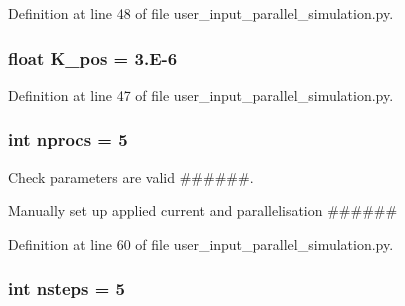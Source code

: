 Definition at line 48 of file user\-\_\-input\-\_\-parallel\-\_\-simulation.\-py.

\hypertarget{namespaceuser__input__parallel__simulation_ab1a8ebec490ba1301f818bd1c5f1f3fa}{
\subsubsection[{K\-\_\-pos}]{\setlength{\rightskip}{0pt plus 5cm}float K\-\_\-pos = 3.\-E-\/6}}\label{namespaceuser__input__parallel__simulation_ab1a8ebec490ba1301f818bd1c5f1f3fa}


Definition at line 47 of file user\-\_\-input\-\_\-parallel\-\_\-simulation.\-py.

\hypertarget{namespaceuser__input__parallel__simulation_ad7c4c17cf720ee538e27c02ab356ed6b}{
\subsubsection[{nprocs}]{\setlength{\rightskip}{0pt plus 5cm}int nprocs = 5}}\label{namespaceuser__input__parallel__simulation_ad7c4c17cf720ee538e27c02ab356ed6b}


Check parameters are valid \#\#\#\#\#\#. 

Manually set up applied current and parallelisation \#\#\#\#\#\# 

Definition at line 60 of file user\-\_\-input\-\_\-parallel\-\_\-simulation.\-py.

\hypertarget{namespaceuser__input__parallel__simulation_aa2414080b021dbb9b56eeaeedec0ffa2}{
\subsubsection[{nsteps}]{\setlength{\rightskip}{0pt plus 5cm}int nsteps = 5}}\label{namespaceuser__input__parallel__simulation_aa2414080b021dbb9b56eeaeedec0ffa2}


